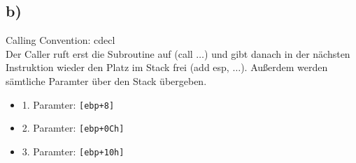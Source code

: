 \documentclass[]{scrreprt}
\begin{document}
\subsection*{b)}
Calling Convention: cdecl\\
Der Caller ruft erst die Subroutine auf (call $\dots$) und gibt danach in der nächsten Instruktion wieder den Platz im Stack frei (add esp, $\dots$). Außerdem werden sämtliche Paramter über den Stack übergeben.
\begin{itemize}
	\item 1. Paramter: \texttt{[ebp+8]}
	\item 2. Paramter: \texttt{[ebp+0Ch]}
	\item 3. Paramter: \texttt{[ebp+10h]}
\end{itemize}
\end{document}
